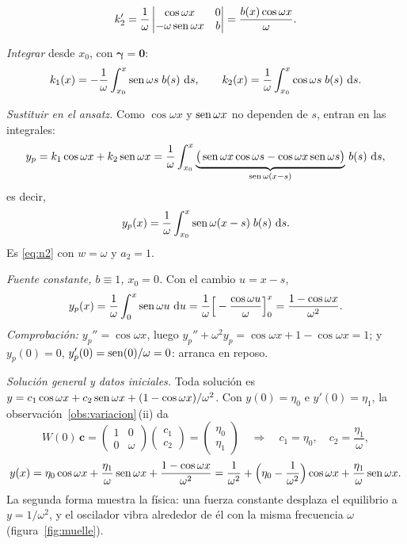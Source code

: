 \documentclass[11pt,twoside]{article}
\newcommand\vc{\bm c}
\newcommand\vgamma{\bm\gamma}
\newcommand\mat[1]{\begin{pmatrix}#1\end{pmatrix}}
\begin{document}
\begin{ejemplo}[Oscilador forzado, $y''+\omega^2y=b(x)$, con $\omega>0$]
\begin{pasos}
\begin{equation*}
k_2'=\frac1\omega\begin{vmatrix}\cos\omega x&0\\-\omega\operatorname{sen}\omega x&b\end{vmatrix}=\frac{b(x)\cos\omega x}{\omega}.
\end{equation*}
\item \emph{Integrar} desde $x_0$, con $\vgamma=\bm0$:
\begin{equation*}
k_1(x)=-\frac1\omega\int_{x_0}^{x}\operatorname{sen}\omega s\;b(s)\,\mathop{}\!\mathrm{d} s,\qquad k_2(x)=\frac1\omega\int_{x_0}^{x}\cos\omega s\;b(s)\,\mathop{}\!\mathrm{d} s.
\end{equation*}
\item \emph{Sustituir en el ansatz.} Como $\cos\omega x$ y $\operatorname{sen}\omega x$ no dependen de $s$, entran en las integrales:
\begin{equation*}
y_p=k_1\cos\omega x+k_2\operatorname{sen}\omega x=\frac1\omega\int_{x_0}^{x}\underbrace{\big(\operatorname{sen}\omega x\cos\omega s-\cos\omega x\operatorname{sen}\omega s\big)}_{\operatorname{sen}\omega(x-s)}\,b(s)\,\mathop{}\!\mathrm{d} s,
\end{equation*}
es decir,
\begin{equation}\label{eq:forzado}
y_p(x)=\frac1\omega\int_{x_0}^{x}\operatorname{sen}\omega(x-s)\;b(s)\,\mathop{}\!\mathrm{d} s.
\end{equation}
Es \eqref{eq:n2} con $w=\omega$ y $a_2=1$.
\item \emph{Fuente constante, $b\equiv1$, $x_0=0$.} Con el cambio $u=x-s$,
\begin{equation*}
y_p(x)=\frac1\omega\int_0^{x}\operatorname{sen}\omega u\,\mathop{}\!\mathrm{d} u=\frac1\omega\Big[-\frac{\cos\omega u}{\omega}\Big]_0^{x}=\frac{1-\cos\omega x}{\omega^2}.
\end{equation*}
\emph{Comprobación:} $y_p''=\cos\omega x$, luego $y_p''+\omega^2y_p=\cos\omega x+1-\cos\omega x=1$; y $y_p(0)=0$,
$y_p'(0)=\operatorname{sen}(0)/\omega=0$: arranca en reposo.
\item \emph{Solución general y datos iniciales.} Toda solución es $y=c_1\cos\omega x+c_2\operatorname{sen}\omega x+(1-\cos\omega x)/\omega^2$.
Con $y(0)=\eta_0$ e $y'(0)=\eta_1$, la observación~\ref{obs:variacion}\,(ii) da
\begin{equation*}
W(0)\,\vc=\mat{1&0\\0&\omega}\mat{c_1\\c_2}=\mat{\eta_0\\ \eta_1}\quad\Longrightarrow\quad c_1=\eta_0,\quad c_2=\frac{\eta_1}{\omega},
\end{equation*}
\begin{equation*}
y(x)=\eta_0\cos\omega x+\frac{\eta_1}{\omega}\operatorname{sen}\omega x+\frac{1-\cos\omega x}{\omega^2}
=\frac1{\omega^2}+\Big(\eta_0-\frac1{\omega^2}\Big)\cos\omega x+\frac{\eta_1}{\omega}\operatorname{sen}\omega x.
\end{equation*}
La segunda forma muestra la física: una fuerza constante desplaza el equilibrio a $y=1/\omega^2$, y el oscilador vibra
alrededor de él con la misma frecuencia $\omega$ (figura~\ref{fig:muelle}).
\end{pasos}
\end{ejemplo}
\end{document}
